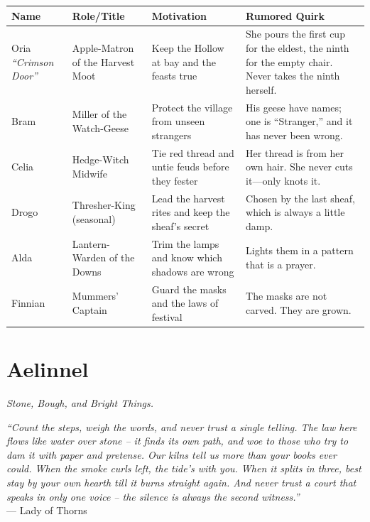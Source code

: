 \documentclass[12pt,oneside]{book}
\begin{document}
\begin{longtable}{|p{}|p{}|p{}|p{}|}
\hline
\textbf{Name} & \textbf{Role/Title} & \textbf{Motivation} & \textbf{Rumored Quirk} \\
\hline
Oria \textit{``Crimson Door''} & Apple-Matron of the Harvest Moot & Keep the Hollow at bay and the feasts true & She pours the first cup for the eldest, the ninth for the empty chair. Never takes the ninth herself. \\
\hline
Bram & Miller of the Watch-Geese & Protect the village from unseen strangers & His geese have names; one is ``Stranger,'' and it has never been wrong. \\
\hline
Celia & Hedge-Witch Midwife & Tie red thread and untie feuds before they fester & Her thread is from her own hair. She never cuts it---only knots it. \\
\hline
Drogo & Thresher-King (seasonal) & Lead the harvest rites and keep the sheaf's secret & Chosen by the last sheaf, which is always a little damp. \\
\hline
Alda & Lantern-Warden of the Downs & Trim the lamps and know which shadows are wrong & Lights them in a pattern that is a prayer. \\
\hline
Finnian & Mummers' Captain & Guard the masks and the laws of festival & The masks are not carved. They are grown. \\
\hline
\end{longtable}



\newpage

\chapter{Aelinnel}
\emph{Stone, Bough, and Bright Things.}

\noindent
\textit{``Count the steps, weigh the words, and never trust a single telling. The law here flows like water over stone -- it finds its own path, and woe to those who try to dam it with paper and pretense. Our kilns tell us more than your books ever could. When the smoke curls left, the tide's with you. When it splits in three, best stay by your own hearth till it burns straight again. And never trust a court that speaks in only one voice -- the silence is always the second witness.''} \\
--- Lady of Thorns
\end{document}
